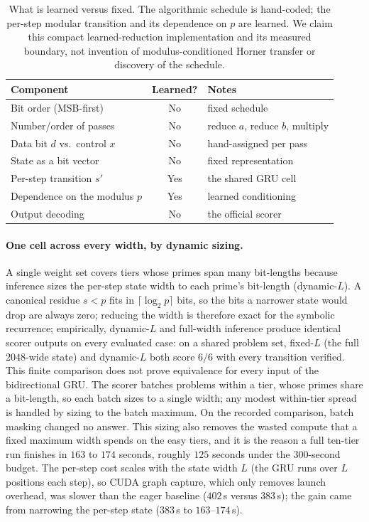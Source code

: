 \documentclass[11pt]{article}
\begin{document}
\begin{table}[t]
 \centering\small
 \begin{tabular}{lcl}
 \toprule
 Component & Learned? & Notes \\
 \midrule
 Bit order (MSB-first) & No & fixed schedule \\
 Number/order of passes & No & reduce $a$, reduce $b$, multiply \\
 Data bit $d$ vs.\ control $x$ & No & hand-assigned per pass \\
 State as a bit vector & No & fixed representation \\
 Per-step transition $s'$ & Yes & the shared GRU cell \\
 Dependence on the modulus $p$ & Yes & learned conditioning \\
 Output decoding & No & the official scorer \\
 \bottomrule
 \end{tabular}
 \caption{What is learned versus fixed. The algorithmic schedule is hand-coded; the
 per-step modular transition and its dependence on $p$ are learned. We claim this
 compact learned-reduction implementation and its measured boundary, not invention
 of modulus-conditioned Horner transfer or discovery of the schedule.}
 \label{tab:learned-vs-fixed}
\end{table}

\paragraph{One cell across every width, by dynamic sizing.}
A single weight set covers tiers whose primes span many bit-lengths because
inference sizes the per-step state width to each prime's bit-length (dynamic-$L$).
A canonical residue $s < p$ fits in $\lceil \log_2 p \rceil$ bits, so the bits a
narrower state would drop are always zero; reducing the width is therefore
exact for the symbolic recurrence; empirically, dynamic-$L$ and full-width inference
produce identical scorer outputs on every evaluated case: on a shared problem set,
fixed-$L$ (the full $2048$-wide state) and dynamic-$L$ both score $6/6$ with every
transition verified. This finite comparison does not prove equivalence for every
input of the bidirectional GRU. The scorer batches problems within a
tier, whose primes share a bit-length, so each batch sizes to a single width; any
modest within-tier spread is handled by sizing to the batch maximum. On the
recorded comparison, batch masking changed no answer. This sizing also removes the wasted
compute that a fixed maximum width spends on the easy tiers, and it is the reason a
full ten-tier run finishes in $163$ to $174$ seconds, roughly $125$ seconds under
the $300$-second budget. The per-step cost scales with the state width $L$ (the GRU runs over $L$ positions
each step), so CUDA graph capture, which only removes launch overhead, was slower
than the eager baseline ($402$\,s versus $383$\,s); the gain came from narrowing the
per-step state ($383$\,s to $163$--$174$\,s).
\end{document}
